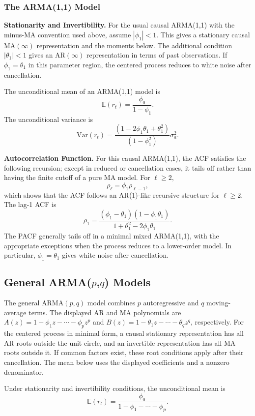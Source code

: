 \subsubsection{The ARMA(1,1) Model}
\textbf{Stationarity and Invertibility.}
For the usual causal ARMA(1,1) with the minus-MA convention used
above, assume $|\phi_1|<1$. This gives a stationary causal
MA$(\infty)$ representation and the moments below. The additional
condition $|\theta_1|<1$ gives an AR$(\infty)$ representation in terms
of past observations. If $\phi_1=\theta_1$ in this parameter region,
the centered process reduces to white noise after cancellation.

The unconditional mean of an ARMA(1,1) model is
\[
\mathbb{E}(r_t) = \frac{\phi_0}{1 - \phi_1}.
\]
The unconditional variance is
\[
\mathrm{Var}(r_t) = \frac{(1 - 2\phi_1\theta_1 + \theta_1^2)}{(1 - \phi_1^2)}\sigma_a^2.
\]

\textbf{Autocorrelation Function.}
For this causal ARMA(1,1), the ACF satisfies the following recursion;
except in reduced or cancellation cases, it tails off rather than
having the finite cutoff of a pure MA model. For $\ell\ge2$,
\[
\rho_\ell = \phi_1 \rho_{\ell-1},
\]
which shows that the ACF follows an AR(1)-like recursive structure for $\ell \geq 2$. The lag-1 ACF is
\[
\rho_1=\frac{(\phi_1-\theta_1)(1-\phi_1\theta_1)}
{1+\theta_1^2-2\phi_1\theta_1}.
\]
The PACF generally tails off in a minimal mixed ARMA(1,1), with
the appropriate exceptions when the process reduces to a lower-order
model. In particular, $\phi_1=\theta_1$ gives white noise after cancellation.

\subsection[General ARMA(p,q) Models]
{General ARMA(\texorpdfstring{$p$}{p},\texorpdfstring{$q$}{q}) Models}
The general ARMA$(p,q)$ model combines $p$ autoregressive and $q$
moving-average terms. The displayed AR and MA polynomials are
$A(z)=1-\phi_1z-\cdots-\phi_pz^p$ and
$B(z)=1-\theta_1z-\cdots-\theta_qz^q$, respectively.
For the centered process in minimal form, a causal stationary
representation has all AR roots outside the unit circle, and an
invertible representation has all MA roots outside it. If common factors
exist, these root conditions apply after their cancellation. The mean
below uses the displayed coefficients and a nonzero denominator.

Under stationarity and invertibility conditions, the unconditional mean is
\[
\mathbb{E}(r_t) = \frac{\phi_0}{1 - \phi_1 - \cdots - \phi_p}.
\]

